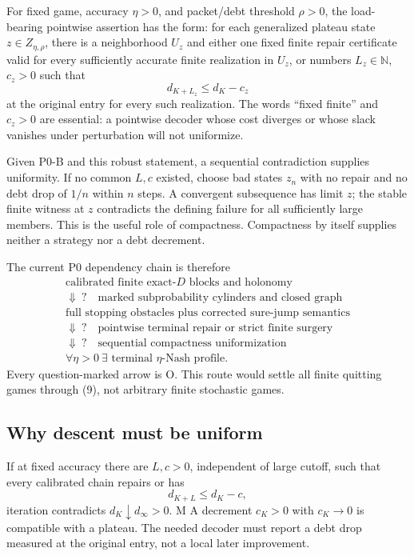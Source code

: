 \documentclass[11pt]{article}
\newcommand{\MTag}{\textsf{M}}
\newcommand{\OTag}{\textsf{O}}
\newcommand{\Audit}{\MTag}
\newcommand{\Open}{\OTag}
\newcommand{\Status}[1]{#1}
\begin{document}
For fixed game, accuracy $\eta>0$, and packet/debt threshold $\rho>0$, the
load-bearing pointwise assertion has the form: for each generalized plateau
state $z\in Z_{\eta,\rho}$, there is a neighborhood $U_z$ and either one
fixed finite repair certificate valid for every sufficiently accurate finite
realization in $U_z$, or numbers $L_z\in\mathbb N$, $c_z>0$ such that
\[
 d_{K+L_z}\leq d_K-c_z
\tag{21}
\]
at the original entry for every such realization.  The words ``fixed finite''
and $c_z>0$ are essential: a pointwise decoder whose cost diverges or whose
slack vanishes under perturbation will not uniformize.

Given P0-B and this robust statement, a sequential contradiction supplies
uniformity.  If no common $L,c$ existed, choose bad states $z_n$ with no
repair and no debt drop of $1/n$ within $n$ steps.  A convergent subsequence
has limit $z$; the stable finite witness at $z$ contradicts the defining
failure for all sufficiently large members.  This is the useful role of
compactness.  Compactness by itself supplies neither a strategy nor a debt
decrement.

The current P0 dependency chain is therefore
\[
\begin{array}{c}
\text{calibrated finite exact-}D\text{ blocks and holonomy}\\
\Downarrow\ ?\quad\text{marked subprobability cylinders and closed graph}\\
\text{full stopping obstacles plus corrected sure-jump semantics}\\
\Downarrow\ ?\quad\text{pointwise terminal repair or strict finite surgery}\\
\Downarrow\ ?\quad\text{sequential compactness uniformization}\\
\forall\eta>0\ \exists\text{ terminal }\eta\text{-Nash profile}.
\end{array}
\tag{22}
\]
Every question-marked arrow is \Status{\Open}.  This route would settle all
finite quitting games through (9), not arbitrary finite stochastic games.

\subsection{Why descent must be uniform}

If at fixed accuracy there are \(L,c>0\), independent of large cutoff, such
that every calibrated chain repairs or has
\[
 d_{K+L}\leq d_K-c,
\tag{23}
\]
iteration contradicts \(d_K\downarrow d_\infty>0\).
\Status{\Audit} A decrement \(c_K>0\) with \(c_K\to0\) is compatible with a
plateau.  The needed decoder must report a debt drop measured at the original
entry, not a local later improvement.
\end{document}
